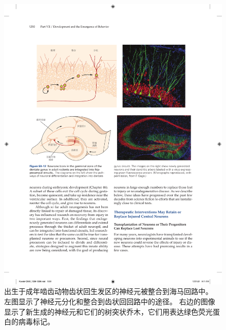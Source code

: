 \begin{figure}[htbp]
	\centering
	\includegraphics[width=1.0\linewidth]{chap50/fig_50_12}
	\caption{出生于成年啮齿动物齿状回生发区的神经元被整合到海马回路中。
		左图显示了神经元分化和整合到齿状回回路中的途径。
		右边的图像显示了新生成的神经元和它们的树突状乔木，它们用表达绿色荧光蛋白的病毒标记。}
	\label{fig:50_12}
\end{figure}


